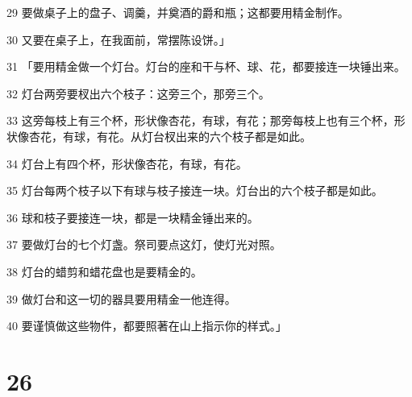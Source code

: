 \par 29 要做桌子上的盘子、调羹，并奠酒的爵和瓶；这都要用精金制作。
\par 30 又要在桌子上，在我面前，常摆陈设饼。」
\par 31 「要用精金做一个灯台。灯台的座和干与杯、球、花，都要接连一块锤出来。
\par 32 灯台两旁要杈出六个枝子：这旁三个，那旁三个。
\par 33 这旁每枝上有三个杯，形状像杏花，有球，有花；那旁每枝上也有三个杯，形状像杏花，有球，有花。从灯台杈出来的六个枝子都是如此。
\par 34 灯台上有四个杯，形状像杏花，有球，有花。
\par 35 灯台每两个枝子以下有球与枝子接连一块。灯台出的六个枝子都是如此。
\par 36 球和枝子要接连一块，都是一块精金锤出来的。
\par 37 要做灯台的七个灯盏。祭司要点这灯，使灯光对照。
\par 38 灯台的蜡剪和蜡花盘也是要精金的。
\par 39 做灯台和这一切的器具要用精金一他连得。
\par 40 要谨慎做这些物件，都要照著在山上指示你的样式。」

\chapter{26}

